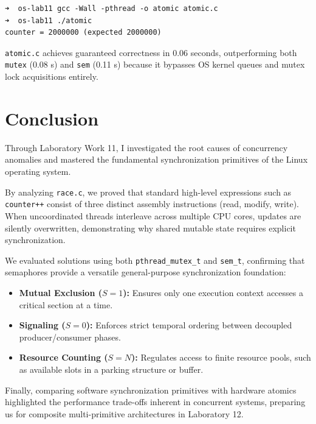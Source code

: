 \documentclass{labreport}
\begin{document}
\begin{lstlisting}[style=bash]
➜  os-lab11 gcc -Wall -pthread -o atomic atomic.c
➜  os-lab11 ./atomic
counter = 2000000 (expected 2000000)
\end{lstlisting}

\texttt{atomic.c} achieves guaranteed correctness in 0.06 seconds, outperforming both \texttt{mutex} (0.08 s) and \texttt{sem} (0.11 s) because it bypasses OS kernel queues and mutex lock acquisitions entirely.

\section{Conclusion}

Through Laboratory Work 11, I investigated the root causes of concurrency anomalies and mastered the fundamental synchronization primitives of the Linux operating system.

By analyzing \texttt{race.c}, we proved that standard high-level expressions such as \texttt{counter++} consist of three distinct assembly instructions (read, modify, write). When uncoordinated threads interleave across multiple CPU cores, updates are silently overwritten, demonstrating why shared mutable state requires explicit synchronization.

We evaluated solutions using both \texttt{pthread\_mutex\_t} and \texttt{sem\_t}, confirming that semaphores provide a versatile general-purpose synchronization foundation:
\begin{itemize}[noitemsep]
    \item \textbf{Mutual Exclusion ($S=1$):} Ensures only one execution context accesses a critical section at a time.
    \item \textbf{Signaling ($S=0$):} Enforces strict temporal ordering between decoupled producer/consumer phases.
    \item \textbf{Resource Counting ($S=N$):} Regulates access to finite resource pools, such as available slots in a parking structure or buffer.
\end{itemize}

Finally, comparing software synchronization primitives with hardware atomics highlighted the performance trade-offs inherent in concurrent systems, preparing us for composite multi-primitive architectures in Laboratory 12.
\end{document}
